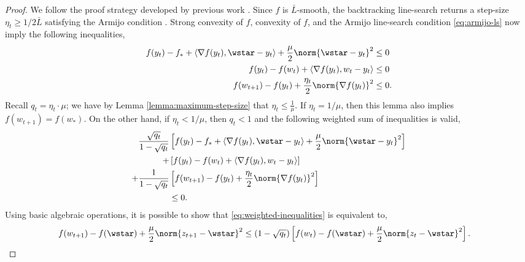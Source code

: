 \documentclass[10pt]{article} %
\newcommand{\yk}{y_t}
\newcommand{\zk}{z_t}
\newcommand{\zkk}{z_{t+1}}
\newcommand{\wk}{w_t}
\newcommand{\wkk}{w_{t+1}}
\newcommand{\etak}{\eta_{t}}
\newcommand{\fstar}{f_*}
\newcommand{\grad}{\nabla{} f}
\newcommand{\rbr}[1]{\left(#1\right)}
\newcommand{\sbr}[1]{\left[#1\right]}
\newcommand{\abr}[1]{\left\langle#1\right\rangle}
\begin{document}
\begin{proof}
    We follow the proof strategy developed by previous work \cite{daspremont2021acceleration}.
    Since \( f \) is \( \bar{L} \)-smooth, the backtracking line-search returns a step-size
    \( \etak \geq 1 / 2 \bar L \) satisfying the Armijo condition \cite{nocedal1999numerical}.
    Strong convexity of \( f \), convexity of \( f \), and the Armijo
    line-search condition \cref{eq:armijo-ls} now imply the following
    inequalities,
    \begin{align*}
        f(\yk) - \fstar + \abr{\grad(\yk), \wstar - \yk} + \frac{\mu}{2} \norm{\wstar - \yk}^2
         & \leq 0  \\
        f(\yk) - f(\wk) + \abr{\grad(\yk), \wk - \yk}
         & \leq 0  \\
        f(\wkk) - f(\yk) + \frac{\etak}{2}\norm{\grad(\yk)}^2
         & \leq 0.
    \end{align*}
    Recall \( q_t = \etak \cdot \mu \);
    we have by Lemma \ref{lemma:maximum-step-size} that \( \etak \leq \frac{1}{\mu} \).
    If \( \etak = 1 / \mu \), then this lemma also implies \( f(\wkk) = f(w_*) \).
    On the other hand, if \( \etak < 1 / \mu \), then
    \( q_t < 1 \) and the following weighted sum of inequalities is
    valid,
    \begin{equation}\label{eq:weighted-inequalities}
        \begin{aligned}
            \frac{\sqrt{q_t}}{1 - \sqrt{q_t}} & \sbr{f(\yk) - \fstar + \abr{\grad(\yk), \wstar - \yk} + \frac{\mu}{2} \norm{\wstar - \yk}^2} \\
            +                                 & \sbr{f(\yk) - f(\wk) + \abr{\grad(\yk), \wk - \yk}}                                          \\
            + \frac{1}{1 - \sqrt{q_t}}        & \sbr{f(\wkk) - f(\yk) + \frac{\etak}{2}\norm{\grad(\yk)}^2}                                  \\
                                              & \leq 0.
        \end{aligned}
    \end{equation}
    Using basic algebraic operations, it is possible to show that
    \cref{eq:weighted-inequalities} is equivalent to,
    \begin{equation}\label{eq:potential-decrease}
        \begin{aligned}
            f(\wkk) - f(\wstar) + \frac{\mu}{2} \norm{\zkk - \wstar}^2
             & \leq
            \rbr{1 - \sqrt{q_t}}
            \sbr{ f(\wk) - f(\wstar) + \frac{\mu}{2} \norm{\zk - \wstar}^2}.

\end{aligned}
\end{equation}
\end{proof}
\end{document}
